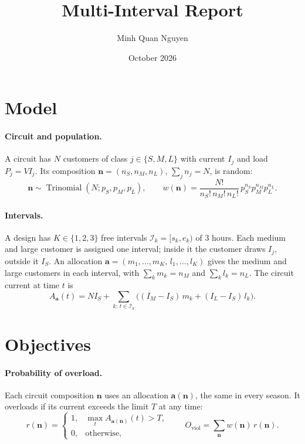 \documentclass[11pt,a4paper]{article}
\title{Multi-Interval Report}
\author{Minh Quan Nguyen}
\date{October 2026}
\newcommand{\bn}{\boldsymbol n}
\newcommand{\ba}{\boldsymbol a}
\begin{document}
\maketitle

\section{Model}

\paragraph{Circuit and population.}
A circuit has \(N\) customers of class \(j\in\{S,M,L\}\) with current \(I_j\) and load \(P_j=VI_j\).
Its composition \(\bn=(n_S,n_M,n_L)\), \(\sum_j n_j=N\), is random:
\begin{equation}
  \bn\sim\operatorname{Trinomial}(N;p_S,p_M,p_L),\qquad
  w(\bn)=\frac{N!}{n_S!\,n_M!\,n_L!}\,p_S^{n_S}p_M^{n_M}p_L^{n_L}.
\end{equation}

\paragraph{Intervals.}
A design has \(K\in\{1,2,3\}\) free intervals \(\mathcal I_k=[s_k,e_k)\) of 3 hours. Each medium and
large customer is assigned one interval; inside it the customer draws \(I_j\), outside it \(I_S\). An
allocation \(\ba=(m_1,\dots,m_K,\,l_1,\dots,l_K)\) gives the medium and large customers in each
interval, with \(\sum_k m_k=n_M\) and \(\sum_k l_k=n_L\). The circuit current at time \(t\) is
\begin{equation}
  A_{\ba}(t)=NI_S+\sum_{k:\,t\in\mathcal I_k}\bigl((I_M-I_S)\,m_k+(I_L-I_S)\,l_k\bigr).
\end{equation}

\section{Objectives}

\paragraph{Probability of overload.}
Each circuit composition \(\bn\) uses an allocation \(\ba(\bn)\), the same in every season. It overloads
if its current exceeds the limit \(T\) at any time:
\begin{equation}
  r(\bn)=\begin{cases}1, & \max_t A_{\ba(\bn)}(t)>T,\\ 0, & \text{otherwise,}\end{cases}\qquad
  O_{\mathrm{viol}}=\sum_{\bn}w(\bn)\,r(\bn).
\end{equation}
\end{document}
